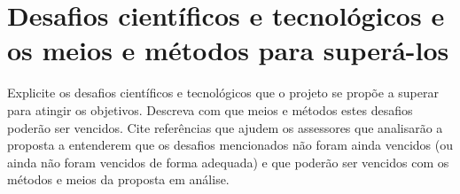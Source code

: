 \chapter{Desafios científicos e tecnológicos e os meios e métodos para superá-los}\label{chp:desafios}

Explicite os desafios científicos e tecnológicos que o projeto se propõe a superar para atingir os objetivos. Descreva com que meios e métodos estes desafios poderão ser vencidos. Cite referências que ajudem os assessores que analisarão a proposta a entenderem que os desafios mencionados não foram ainda vencidos (ou ainda não foram vencidos de forma adequada) e que poderão ser vencidos com os métodos e meios da proposta em análise.